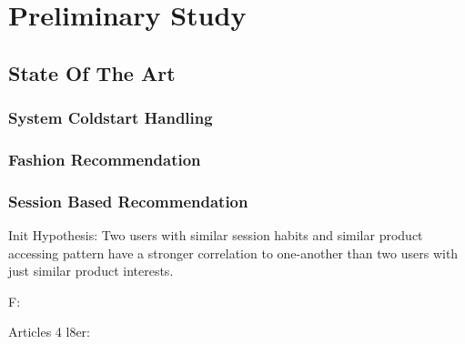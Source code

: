 
\chapter{Preliminary Study}
\minitoc

\clearpage

\section{State Of The Art}
\subsection{System Coldstart Handling}
\subsection{Fashion Recommendation}
\subsection{Session Based Recommendation}
Init Hypothesis:
Two users with similar session habits and similar product accessing pattern have a stronger correlation to one-another than two users with just similar product interests.

F:


Articles 4 l8er:





